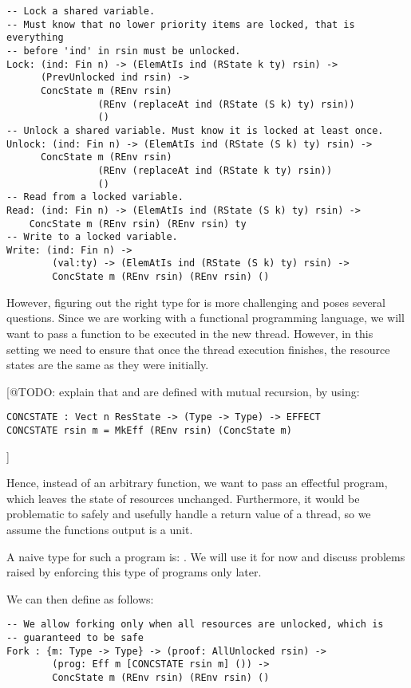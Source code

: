 \begin{verbatim}
-- Lock a shared variable.
-- Must know that no lower priority items are locked, that is everything
-- before 'ind' in rsin must be unlocked.
Lock: (ind: Fin n) -> (ElemAtIs ind (RState k ty) rsin) ->
      (PrevUnlocked ind rsin) ->
      ConcState m (REnv rsin)
                (REnv (replaceAt ind (RState (S k) ty) rsin))
                ()
-- Unlock a shared variable. Must know it is locked at least once.
Unlock: (ind: Fin n) -> (ElemAtIs ind (RState (S k) ty) rsin) ->
      ConcState m (REnv rsin)
                (REnv (replaceAt ind (RState k ty) rsin))
                ()
-- Read from a locked variable.
Read: (ind: Fin n) -> (ElemAtIs ind (RState (S k) ty) rsin) ->
    ConcState m (REnv rsin) (REnv rsin) ty
-- Write to a locked variable.
Write: (ind: Fin n) ->
        (val:ty) -> (ElemAtIs ind (RState (S k) ty) rsin) ->
        ConcState m (REnv rsin) (REnv rsin) ()
\end{verbatim}

However, figuring out the right type for  is more challenging and
poses several questions. Since we are working with a functional programming
language, we will want to pass a function to be executed in the new thread.
However, in this setting we need to ensure that once the thread execution
finishes, the resource states are the same as they were initially.

[@TODO: explain that  and  are defined with
mutual recursion, by using:
\begin{verbatim}
CONCSTATE : Vect n ResState -> (Type -> Type) -> EFFECT
CONCSTATE rsin m = MkEff (REnv rsin) (ConcState m)
\end{verbatim}
]

Hence, instead of an arbitrary function, we want to pass an effectful program,
which leaves the state of resources unchanged. Furthermore, it would be
problematic to safely and usefully handle a return value of a thread, so we
assume the functions output is a unit.

A naive type for such a program is: . We will
use it for now and discuss problems raised by enforcing this type of programs
only later.

We can then define  as follows:
\begin{verbatim}
-- We allow forking only when all resources are unlocked, which is
-- guaranteed to be safe
Fork : {m: Type -> Type} -> (proof: AllUnlocked rsin) ->
        (prog: Eff m [CONCSTATE rsin m] ()) ->
        ConcState m (REnv rsin) (REnv rsin) ()
\end{verbatim}

